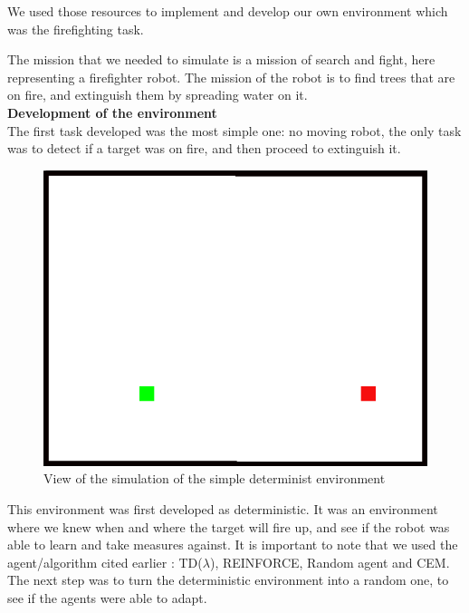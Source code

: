 \documentclass[conference]{IEEEtran}
\begin{document}
We used those resources to implement and develop our own environment which was the firefighting task.

The mission that we needed to simulate is a mission of search and fight, here representing a firefighter robot. The mission of the robot is to find trees that are on fire, and extinguish them by spreading water on it.\\

\textbf{Development of the environment}\\

The first task developed was the most simple one: no moving robot, the only task was to detect if a target was on fire, and then proceed to extinguish it.\\

\begin{figure}
  \includegraphics[scale = 0.4]{images/1Dultrasimple.png}
  \caption{View of the simulation of the simple determinist environment}
  \label{fig:my-figure}
\end{figure}

This environment was first developed as deterministic. It was an environment where we knew when and where the target will fire up, and see if the robot was able to learn and take measures against.
It is important to note that we used the agent/algorithm cited earlier : TD($\lambda$), REINFORCE, Random agent and CEM.\\

The next step was to turn the deterministic environment into a random one, to see if the agents were able to adapt.\\
\end{document}

